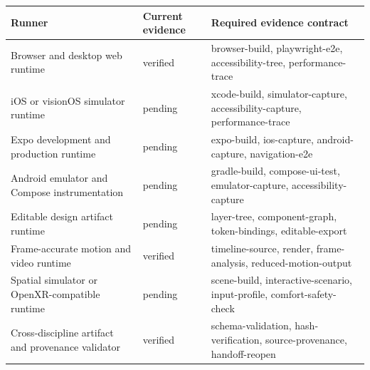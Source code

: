 \begin{tabularx}{\textwidth}{@{}p{}p{}X@{}}
\toprule
Runner & Current evidence & Required evidence contract \\
\midrule
Browser and desktop web runtime & verified & browser-build, playwright-e2e, accessibility-tree, performance-trace \\
iOS or visionOS simulator runtime & pending & xcode-build, simulator-capture, accessibility-capture, performance-trace \\
Expo development and production runtime & pending & expo-build, ios-capture, android-capture, navigation-e2e \\
Android emulator and Compose instrumentation & pending & gradle-build, compose-ui-test, emulator-capture, accessibility-capture \\
Editable design artifact runtime & pending & layer-tree, component-graph, token-bindings, editable-export \\
Frame-accurate motion and video runtime & verified & timeline-source, render, frame-analysis, reduced-motion-output \\
Spatial simulator or OpenXR-compatible runtime & pending & scene-build, interactive-scenario, input-profile, comfort-safety-check \\
Cross-discipline artifact and provenance validator & verified & schema-validation, hash-verification, source-provenance, handoff-reopen \\
\bottomrule
\end{tabularx}
